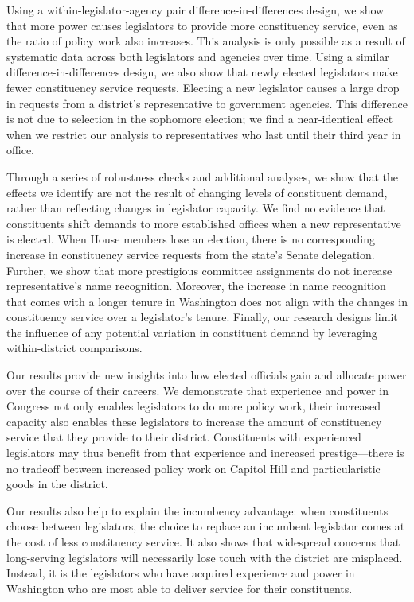 \documentclass[12pt]{article}
\begin{document}
Using a within-legislator-agency pair difference-in-differences design, we show that more power causes legislators to provide more constituency service, even as the ratio of policy work also increases. This analysis is only possible as a result of systematic data across both legislators and agencies over time.  Using a similar difference-in-differences design, we also show that newly elected legislators make fewer constituency service requests. Electing a new legislator causes a large drop in requests from a district's representative to government agencies. This difference is not due to selection in the sophomore election; we find a near-identical effect when we restrict our analysis to representatives who last until their third year in office.

Through a series of robustness checks and additional analyses, we show that the effects we identify are not the result of changing levels of constituent demand, rather than reflecting changes in legislator capacity. We find no evidence that constituents shift demands to more established offices when a new representative is elected. When House members lose an election, there is no corresponding increase in constituency service requests from the state's Senate delegation. Further, we show that more prestigious committee assignments do not increase representative's name recognition. %
Moreover, the increase in name recognition that comes with a longer tenure in Washington does not align with the changes in constituency service over a legislator's tenure. Finally, our research designs limit the influence of any potential variation in constituent demand by leveraging within-district comparisons.  

Our results provide new insights into how elected officials gain and allocate power over the course of their careers. We demonstrate that experience and power in Congress not only enables legislators to do more policy work, their increased capacity also enables these legislators to increase the amount of constituency service that they provide to their district. Constituents with experienced legislators may thus benefit from that experience and increased prestige---there is no tradeoff between increased policy work on Capitol Hill and particularistic goods in the district. 

Our results also help to explain the incumbency advantage: when constituents choose between legislators, the choice to replace an incumbent legislator comes at the cost of less constituency service. It also shows that widespread concerns that long-serving legislators will necessarily lose touch with the district are misplaced. Instead, it is the legislators who have acquired experience and power in Washington who are most able to deliver service for their constituents.   
\end{document}
